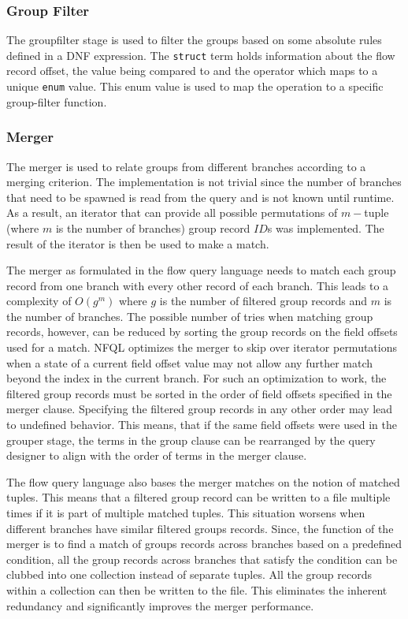 \subsubsection{Group Filter} The groupfilter stage is used to filter the
groups based on some absolute rules defined in a \ac{DNF} expression. The
\texttt{struct} term holds information about the flow record offset, the value
being compared to and the operator which maps to a unique \texttt{enum} value.
This enum value is used to map the operation to a specific group-filter
function.

\subsubsection{Merger}

The merger is used to relate groups from different branches according to a
merging criterion. The implementation is not trivial since the number of
branches that need to be spawned is read from the query and is not known until
runtime. As a result, an iterator that can provide all possible permutations
of $m-$tuple (where $m$ is the number of branches) group record $ID$s was
implemented. The result of the iterator is then be used to make a match.

The merger as formulated in the flow query language needs to match each group
record from one branch with every other record of each branch. This leads to a
complexity of $O(g^m)$ where $g$ is the number of filtered group records and
$m$ is the number of branches. The possible number of tries when matching
group records, however, can be reduced by sorting the group records on the
field offsets used for a match. \ac{NFQL} optimizes the merger to skip over
iterator permutations when a state of a current field offset value may not
allow any further match beyond the index in the current branch.  For such an
optimization to work, the filtered group records must be sorted in the order
of field offsets specified in the merger clause.  Specifying the filtered
group records in any other order may lead to undefined behavior. This means,
that if the same field offsets were used in the grouper stage, the terms in
the group clause can be rearranged by the query designer to align with the
order of terms in the merger clause.

The flow query language also bases the merger matches on the notion of matched
tuples. This means that a filtered group record can be written to a file
multiple times if it is part of multiple matched tuples. This situation
worsens when different branches have similar filtered groups records. Since,
the function of the merger is to find a match of groups records across
branches based on a predefined condition, all the group records across
branches that satisfy the condition can be clubbed into one collection instead
of separate tuples. All the group records within a collection can then be
written to the file. This eliminates the inherent redundancy and significantly
improves the merger performance.

